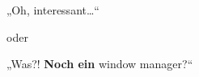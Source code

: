 \documentclass[xetex,serif,compress]{beamer}
\begin{document}
\newcommand{\mslide}[2]{
    \begin{frame}{#1}
        \begin{center}
        \begin{list}{$\bullet$}{\itemsep=1em}
            #2
        \end{list}
        \end{center}
    \end{frame}
}


\begin{frame}{}
\begin{center}
\huge
„Oh, interessant…“

\vspace*{1cm}

oder

\vspace*{1cm}

„Was?! \textbf{Noch ein} window manager?“
\end{center}
\end{frame}
\end{document}
